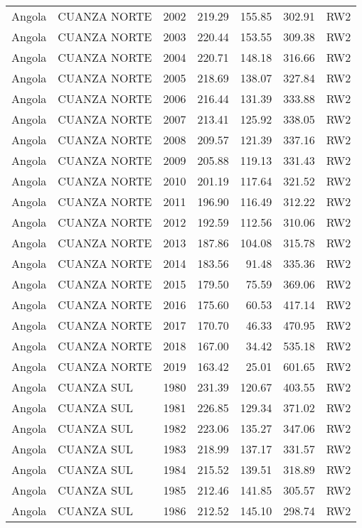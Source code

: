 \begin{longtable}{lllrrrl}
  Angola & CUANZA NORTE & 2002 & 219.29 & 155.85 & 302.91 & RW2 \\ 
  Angola & CUANZA NORTE & 2003 & 220.44 & 153.55 & 309.38 & RW2 \\ 
  Angola & CUANZA NORTE & 2004 & 220.71 & 148.18 & 316.66 & RW2 \\ 
  Angola & CUANZA NORTE & 2005 & 218.69 & 138.07 & 327.84 & RW2 \\ 
  Angola & CUANZA NORTE & 2006 & 216.44 & 131.39 & 333.88 & RW2 \\ 
  Angola & CUANZA NORTE & 2007 & 213.41 & 125.92 & 338.05 & RW2 \\ 
  Angola & CUANZA NORTE & 2008 & 209.57 & 121.39 & 337.16 & RW2 \\ 
  Angola & CUANZA NORTE & 2009 & 205.88 & 119.13 & 331.43 & RW2 \\ 
  Angola & CUANZA NORTE & 2010 & 201.19 & 117.64 & 321.52 & RW2 \\ 
  Angola & CUANZA NORTE & 2011 & 196.90 & 116.49 & 312.22 & RW2 \\ 
  Angola & CUANZA NORTE & 2012 & 192.59 & 112.56 & 310.06 & RW2 \\ 
  Angola & CUANZA NORTE & 2013 & 187.86 & 104.08 & 315.78 & RW2 \\ 
  Angola & CUANZA NORTE & 2014 & 183.56 & 91.48 & 335.36 & RW2 \\ 
  Angola & CUANZA NORTE & 2015 & 179.50 & 75.59 & 369.06 & RW2 \\ 
  Angola & CUANZA NORTE & 2016 & 175.60 & 60.53 & 417.14 & RW2 \\ 
  Angola & CUANZA NORTE & 2017 & 170.70 & 46.33 & 470.95 & RW2 \\ 
  Angola & CUANZA NORTE & 2018 & 167.00 & 34.42 & 535.18 & RW2 \\ 
  Angola & CUANZA NORTE & 2019 & 163.42 & 25.01 & 601.65 & RW2 \\ 
  Angola & CUANZA SUL & 1980 & 231.39 & 120.67 & 403.55 & RW2 \\ 
  Angola & CUANZA SUL & 1981 & 226.85 & 129.34 & 371.02 & RW2 \\ 
  Angola & CUANZA SUL & 1982 & 223.06 & 135.27 & 347.06 & RW2 \\ 
  Angola & CUANZA SUL & 1983 & 218.99 & 137.17 & 331.57 & RW2 \\ 
  Angola & CUANZA SUL & 1984 & 215.52 & 139.51 & 318.89 & RW2 \\ 
  Angola & CUANZA SUL & 1985 & 212.46 & 141.85 & 305.57 & RW2 \\ 
  Angola & CUANZA SUL & 1986 & 212.52 & 145.10 & 298.74 & RW2 \\ 

\end{longtable}
